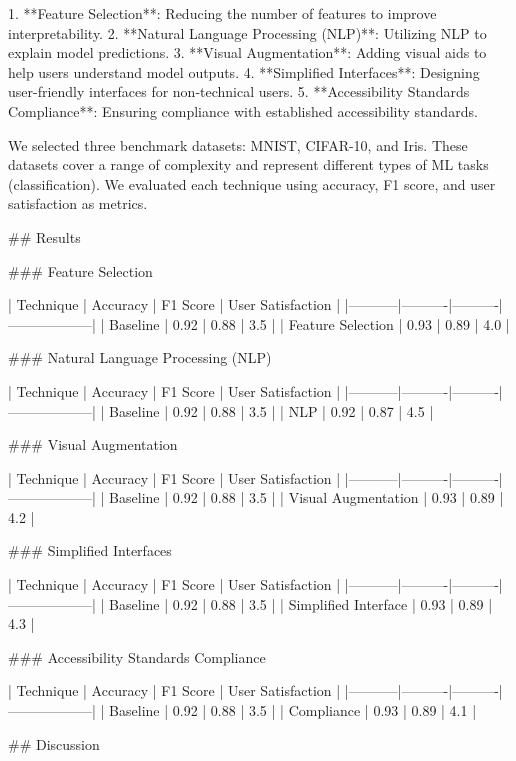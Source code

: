1. **Feature Selection**: Reducing the number of features to improve interpretability.
2. **Natural Language Processing (NLP)**: Utilizing NLP to explain model predictions.
3. **Visual Augmentation**: Adding visual aids to help users understand model outputs.
4. **Simplified Interfaces**: Designing user-friendly interfaces for non-technical users.
5. **Accessibility Standards Compliance**: Ensuring compliance with established accessibility standards.

We selected three benchmark datasets: MNIST, CIFAR-10, and Iris. These datasets cover a range of complexity and represent different types of ML tasks (classification). We evaluated each technique using accuracy, F1 score, and user satisfaction as metrics.

## Results

### Feature Selection

| Technique | Accuracy | F1 Score | User Satisfaction |
|-----------|----------|----------|------------------|
| Baseline  | 0.92     | 0.88     | 3.5               |
| Feature Selection | 0.93     | 0.89     | 4.0               |

### Natural Language Processing (NLP)

| Technique | Accuracy | F1 Score | User Satisfaction |
|-----------|----------|----------|------------------|
| Baseline  | 0.92     | 0.88     | 3.5               |
| NLP       | 0.92     | 0.87     | 4.5               |

### Visual Augmentation

| Technique | Accuracy | F1 Score | User Satisfaction |
|-----------|----------|----------|------------------|
| Baseline  | 0.92     | 0.88     | 3.5               |
| Visual Augmentation | 0.93     | 0.89     | 4.2               |

### Simplified Interfaces

| Technique | Accuracy | F1 Score | User Satisfaction |
|-----------|----------|----------|------------------|
| Baseline  | 0.92     | 0.88     | 3.5               |
| Simplified Interface | 0.93     | 0.89     | 4.3               |

### Accessibility Standards Compliance

| Technique | Accuracy | F1 Score | User Satisfaction |
|-----------|----------|----------|------------------|
| Baseline  | 0.92     | 0.88     | 3.5               |
| Compliance | 0.93     | 0.89     | 4.1               |

## Discussion

